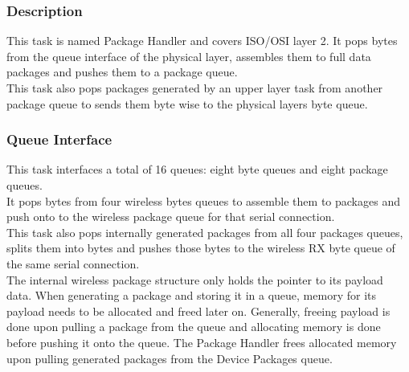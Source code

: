 \subsubsection{Description}
This task is named Package Handler and covers ISO/OSI layer 2. It pops bytes from the queue interface of the physical layer, assembles them to full data packages and pushes them to a package queue.\\
This task also pops packages generated by an upper layer task from another package queue to sends them byte wise to the physical layers byte queue.
\subsubsection{Queue Interface}
This task interfaces a total of 16 queues: eight byte queues and eight package queues.\\
It pops bytes from four wireless bytes queues to assemble them to packages and push onto to the wireless package queue for that serial connection.\\
This task also pops internally generated packages from all four packages queues, splits them into bytes and pushes those bytes to the wireless RX byte queue of the same serial connection.\\
The internal wireless package structure only holds the pointer to its payload data. When generating a package and storing it in a queue, memory for its payload needs to be allocated and freed later on. Generally, freeing payload is done upon pulling a package from the queue and allocating memory is done before pushing it onto the queue. The Package Handler frees allocated memory upon pulling generated packages from the Device Packages queue.
